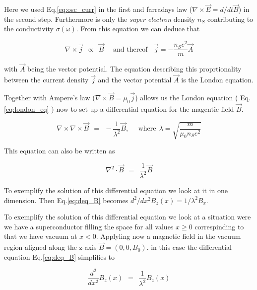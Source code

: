 \documentclass[10pt]{report}
\numberwithin{equation}{chapter}
\newcommand{\myEq}[1]{
  Eq.\ref{#1}
}
\begin{document}
Here we used \myEq{eq:osc_curr} in the first and farradays law ($\nabla \times \vec{E} = d/dt \vec{B}$) in the second step. Furthermore is only the \textit{super electron} density $n_S$ contributing to the conductivity $\sigma(\omega)$. From this equation we can deduce that

\begin{equation}\label{eq:london_eq}
  \nabla \times \vec{j} ~~\propto~~ \vec{B} ~~~~~~\text{and thereof}~~~~ \vec{j} = -\frac{n_Se^2}{m} \vec{A}
\end{equation}

with $\vec{A}$ being the vector potential. The equation describing this proprtionality between the current density $\vec{j}$ and the vector potential $\vec{A}$ is the London equation.


%
Together with Ampere's law ($\nabla \times \vec{B} = \mu_0 \vec{j}$) allows us the London equation (\myEq{eq:london_eq}) now to set up a differential equation for the magentic field $\vec{B}$.

\begin{equation} \label{eq:deq_B_0}
  \nabla \times \nabla \times \vec{B} ~~=~~ -\frac{1}{\lambda^2} \vec{B}, ~~~~~~ \text{where}~~ 
  \lambda = \sqrt{\frac{m}{\mu_0 n_S e^2}}
\end{equation}

This equation can also be written as

\begin{equation} \label{eq:deq_B}
  \nabla^2 \cdot \vec{B} ~~=~~ \frac{1}{\lambda^2} \vec{B}
\end{equation}


To exemplify the solution of this differential equation we look at it in one dimension. Then \myEq{eq:deq_B} becomes $d^2/dx^2 B_z(x) = 1/\lambda^2 B_x$.

To exemplify the solution of this differential equation we look at a situation were we have a superconductor filling the space for all values $x\geq 0$ correspinding to that we have vacuum at $x<0$. Applyling now a magnetic field in the vacuum region aligned along the z-axis $\vec{B} = (0,0,B_0)$. in this case the differential equation \myEq{eq:deq_B} simplifies to 

\begin{equation}
  \frac{d^2}{dx^2} B_z(x) ~~=~~ \frac{1}{\lambda^2} B_z(x)
\end{equation}
\end{document}
